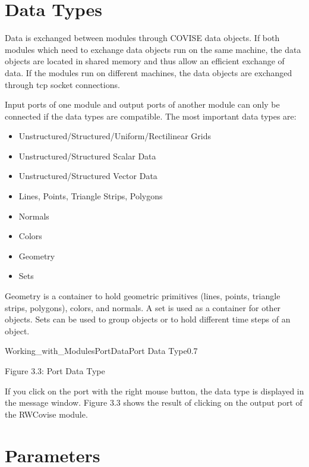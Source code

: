 \section{Data Types}

Data is exchanged between modules through COVISE data objects. If both modules which 
need to exchange data objects run on the same machine, the data objects are located in 
shared memory and thus allow an efficient exchange of data. If the modules run on 
different machines, the data objects are exchanged through tcp socket connections.

Input ports of one module and output ports of another module can only be connected if 
the data types are compatible. The most important data types are:

\begin{itemize}
\item Unstructured/Structured/Uniform/Rectilinear Grids
\item Unstructured/Structured Scalar Data
\item Unstructured/Structured Vector Data
\item Lines, Points, Triangle Strips, Polygons
\item Normals
\item Colors
\item Geometry
\item Sets
\end{itemize}

Geometry is a container to hold geometric primitives (lines, points, triangle strips, 
polygons), colors, and normals. A set is used as a container for other objects. Sets can 
be used to group objects or to hold different time steps of an object. 

\begin{covimg}{Working_with_Modules}{PortData}{Port Data Type}{0.7}\end{covimg}
\begin{htmlonly}
Figure 3.3: Port Data Type
\vspace{0.5cm}
\end{htmlonly}

If you click on the port with the right mouse button, the data type is displayed in the 
message window. Figure 3.3 shows the result of clicking on the output port of the 
RWCovise module.

\section{Parameters}

